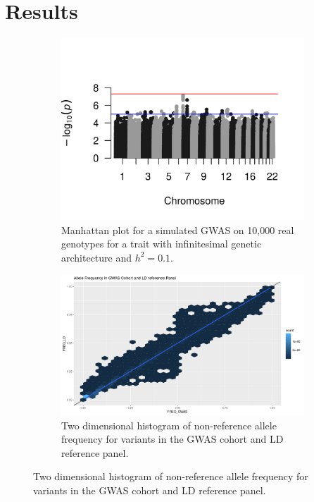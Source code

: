 \section{Results}\label{sec:org26555b8}

\begin{figure}
  \centering
  \begin{subfigure}[t]{\textwidth}
    \centering
    \includegraphics[width=\linewidth]{img/rssp_01.png}
    \caption{Manhattan plot for a simulated GWAS on 10,000 real genotypes for a trait with infinitesimal genetic architecture and $h^2=0.1$.  }\label{fig:gwas_01}
  \end{subfigure}
    \begin{subfigure}[t]{\textwidth}
    \centering
    \includegraphics[width=\linewidth]{img/Allele_freq_match.png}
    \caption{Two dimensional histogram of non-reference allele frequency for variants in the GWAS cohort and LD reference panel.}\label{fig:gwas_01}
  \end{subfigure}
\end{figure}

